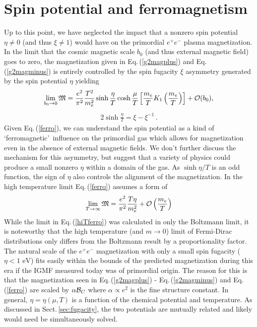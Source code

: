 \documentclass[reprint]{revtex4-2}
\newcommand*{\eV}{\text{ eV}}
\newcommand{\req}[1]{Eq.\,(\ref{#1})}
\newcommand{\rsec}[1]{Sect.\,{\ref{#1}}}
\begin{document}
\section{Spin potential and ferromagnetism}
\label{sec:spin}
\noindent Up to this point, we have neglected the impact that a nonzero spin potential $\eta\neq0$ (and thus $\xi\neq1$) would have on the primordial $e^{+}e^{-}$ plasma magnetization. In the limit that the cosmic magnetic scale $b_{0}$ (and thus external magnetic field) goes to zero, the magnetization given in \req{g2magplus} and \req{g2magminus} is entirely controlled by the spin fugacity $\xi$ asymmetry generated by the spin potential $\eta$ yielding
\begin{align}
    \label{ferro}
    \lim_{b_{0}\rightarrow0}{\mathfrak M}=\frac{e^{2}}{\pi^{2}}\frac{T^{2}}{m_{e}^{2}}\sinh{\frac{\eta}{T}}\cosh{\frac{\mu}{T}}\left[\frac{m_{e}}{T}K_{1}\left(\frac{m_{e}}{T}\right)\right]+{\cal O}(b_{0}),
\end{align}
\begin{align}
    \label{asymmetry}
    2\sinh{\frac{\eta}{T}}=\xi-\xi^{-1}\,.
\end{align}
Given \req{ferro}, we can understand the spin potential as a kind of \lq ferromagnetic\rq\ influence on the primordial gas which allows for magnetization even in the absence of external magnetic fields. We don't further discuss the mechanism for this asymmetry, but suggest that a variety of physics could produce a small nonzero $\eta$ within a domain of the gas. As $\sinh{\eta/T}$ is an odd function, the sign of $\eta$ also controls the alignment of the magnetization. In the high temperature limit \req{ferro} assumes a form of
\begin{align}
    \label{hiTferro}
    \lim_{T\rightarrow\infty}{\mathfrak M}=\frac{e^{2}}{\pi^{2}}\frac{T\eta}{m_{e}^{2}}+{\cal O}\left(\frac{m_{e}}{T}\right)
\end{align}
While the limit in \req{hiTferro} was calculated in only the Boltzmann limit, it is noteworthy that the high temperature (and $m\rightarrow0$) limit of Fermi-Dirac distributions only differs from the Boltzmann result by a proportionality factor. The natural scale of the $e^{+}e^{-}$ magnetization with only a small spin fugacity ($\eta<1\eV$) fits easily within the bounds of the predicted magnetization during this era if the IGMF measured today was of primordial origin. The reason for this is that the magnetization seen in \req{g2magplus} - \req{g2magminus} and \req{ferro} are scaled by $\alpha{\cal B}_{C}$ where $\alpha\propto e^{2}$ is the fine structure constant. In general, $\eta=\eta(\mu,T)$ is a function of the chemical potential and temperature. As discussed in \rsec{sec:fugacity}, the two potentials are mutually related and likely would need be simultaneously solved.
\end{document}
